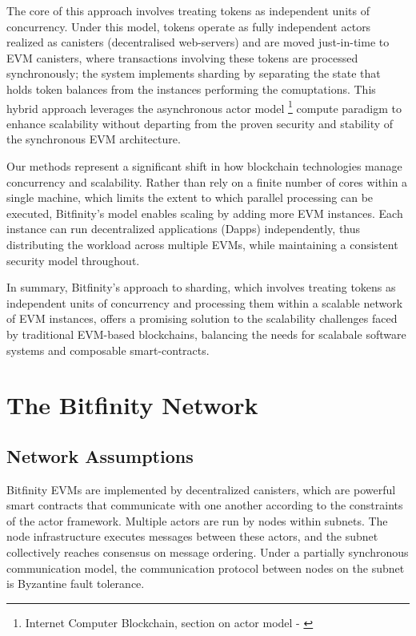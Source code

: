 \documentclass{article}
\begin{document}
 The core of this approach involves treating tokens as independent units of concurrency. Under this model, tokens operate as fully independent actors realized as canisters (decentralised web-servers) and are moved just-in-time to EVM canisters, where transactions involving these tokens are processed synchronously; the system implements sharding by separating the state that holds token balances from the instances performing the comuptations.  This hybrid approach leverages the asynchronous actor model \footnote{Internet Computer Blockchain, section on actor model - \cite{icpgeeks}} compute paradigm to enhance scalability without departing from the proven security and stability of the synchronous EVM architecture.

Our methods represent a significant shift in how blockchain technologies manage concurrency and scalability. Rather than rely on a finite number of cores within a single machine, which limits the extent to which parallel processing can be executed, Bitfinity's model enables scaling by adding more EVM instances. Each instance can run decentralized applications (Dapps) independently, thus distributing the workload across multiple EVMs, while maintaining a consistent security model throughout.

In summary, Bitfinity's approach to sharding, which involves treating tokens as independent units of concurrency and processing them within a scalable network of EVM instances, offers a promising solution to the scalability challenges faced by traditional EVM-based blockchains, balancing the needs for scalabale software systems and composable smart-contracts. 


\section{The Bitfinity Network}
\subsection{Network Assumptions}

Bitfinity EVMs are implemented by decentralized canisters, which are powerful smart contracts that communicate with one another according to the constraints of the actor framework. Multiple actors are run by nodes within subnets. The node infrastructure executes messages between these actors, and the subnet collectively reaches consensus on message ordering. Under a partially synchronous communication model,  the communication protocol between nodes on the subnet is Byzantine fault tolerance.
\end{document}
